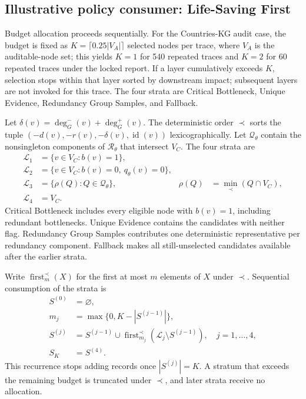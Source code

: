 \documentclass[pdflatex,sn-basic]{sn-jnl}
\begin{document}
\subsection{Illustrative policy consumer: Life-Saving First}

Budget allocation proceeds sequentially. For the Countries-KG audit case, the budget is fixed as $K=\lceil 0.25|V_A|\rceil$ selected nodes per trace, where $V_A$ is the auditable-node set; this yields $K=1$ for 540 repeated traces and $K=2$ for 60 repeated traces under the locked report. If a layer cumulatively exceeds $K$, selection stops within that layer sorted by downstream impact; subsequent layers are not invoked for this trace. The four strata are Critical Bottleneck, Unique Evidence, Redundancy Group Samples, and Fallback.

Let $\delta(v)=\deg_G^-(v)+\deg_G^+(v)$. The deterministic order $\prec$ sorts the tuple $(-d(v),-r(v),-\delta(v),\operatorname{id}(v))$ lexicographically. Let $\mathcal{Q}_{\theta}$ contain the nonsingleton components of $\mathcal{R}_{\theta}$ that intersect $V_C$. The four strata are
\begin{equation}
\begin{aligned}
\mathcal{L}_{1}&=\{v\in V_C:b(v)=1\},\\
\mathcal{L}_{2}&=\{v\in V_C:b(v)=0,\ q_{\theta}(v)=0\},\\
\mathcal{L}_{3}&=\{\rho(Q):Q\in\mathcal{Q}_{\theta}\},
&\rho(Q)&=\min_{\prec}(Q\cap V_C),\\
\mathcal{L}_{4}&=V_C.
\end{aligned}
\label{eq:lsf-strata}
\end{equation}
Critical Bottleneck includes every eligible node with $b(v)=1$, including redundant bottlenecks. Unique Evidence contains the candidates with neither flag. Redundancy Group Samples contributes one deterministic representative per redundancy component. Fallback makes all still-unselected candidates available after the earlier strata.

Write $\operatorname{first}^{\prec}_{m}(X)$ for the first at most $m$ elements of $X$ under $\prec$. Sequential consumption of the strata is
\begin{equation}
\begin{aligned}
S^{(0)}&=\varnothing,\\
m_j&=\max\{0,K-|S^{(j-1)}|\},\\
S^{(j)}&=S^{(j-1)}\cup
\operatorname{first}^{\prec}_{m_j}
\left(\mathcal{L}_{j}\setminus S^{(j-1)}\right),
\quad j=1,\ldots,4,\\
S_K&=S^{(4)}.
\end{aligned}
\label{eq:lsf-recurrence}
\end{equation}
This recurrence stops adding records once $|S^{(j)}|=K$. A stratum that exceeds the remaining budget is truncated under $\prec$, and later strata receive no allocation.
\end{document}
